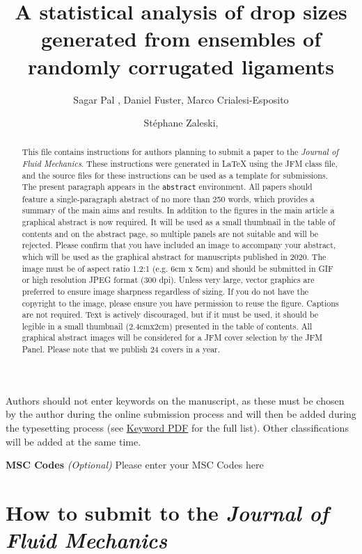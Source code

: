 \documentclass[lineno]{jfm}
\title{A statistical analysis of drop sizes generated from ensembles of randomly corrugated ligaments}
\author{Sagar Pal\aff{1}
  \corresp{\email{sagar.pal@sorbonne-universite.fr}},
  Daniel Fuster\aff{1}, 
  Marco Crialesi-Esposito\aff{2}
  \and St\'ephane Zaleski\aff{1},}
\affiliation{\aff{1}STM Journals, Cambridge University Press, The Printing House, Shaftesbury Road, Cambridge CB2 8BS, UK
\aff{2}DAMTP, Centre for Mathematical Sciences, Wilberforce Road, Cambridge CB3 0WA, UK}
\begin{document}
\maketitle

\begin{abstract}
This file contains instructions for authors planning to submit a paper to the {\it Journal of Fluid Mechanics}. These instructions were generated in {\LaTeX} using the JFM class file, and the source files for these instructions can be used as a template for submissions. The present paragraph appears in the \verb}abstract} environment. All papers should feature a single-paragraph abstract of no more than 250 words, which provides a summary of the main aims and results.  In addition to the figures in the main article a graphical abstract is now required. It will be used as a small thumbnail in the table of contents and on the abstract page, so multiple panels are not suitable and will be rejected. Please confirm that you have included an image to accompany your abstract, which will be used as the graphical abstract for manuscripts published in 2020. The image must be of aspect ratio 1.2:1 (e.g. 6cm x 5cm) and should be submitted in GIF or high resolution JPEG format (300 dpi). Unless very large, vector graphics are preferred to ensure image sharpness regardless of sizing. If you do not have the copyright to the image, please ensure you have permission to reuse the figure. Captions are not required. Text is actively discouraged, but if it must be used, it should be legible in a small thumbnail (2.4cmx2cm) presented in the table of contents. All graphical abstract images will be considered for a JFM cover selection by the JFM Panel. Please note that we publish 24 covers in a year.
\end{abstract}

\begin{keywords}
Authors should not enter keywords on the manuscript, as these must be chosen by the author during the online submission process and will then be added during the typesetting process (see \href{https://www.cambridge.org/core/journals/journal-of-fluid-mechanics/information/list-of-keywords}{Keyword PDF} for the full list).  Other classifications will be added at the same time.
\end{keywords}

{\bf MSC Codes }  {\it(Optional)} Please enter your MSC Codes here

\section{How to submit to the \emph{Journal of Fluid Mechanics}}
\label{sec:intro}
\end{document}
